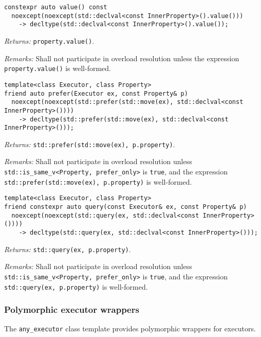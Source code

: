 \documentclass[a4paper,12pt,notitlepage,twoside,openright]{article}
\begin{document}
\begin{verbatim}
constexpr auto value() const
  noexcept(noexcept(std::declval<const InnerProperty>().value()))
    -> decltype(std::declval<const InnerProperty>().value());
\end{verbatim}

\emph{Returns:} \texttt{property.value()}.

\emph{Remarks:} Shall not participate in overload resolution unless the
expression \texttt{property.value()} is well-formed.

\begin{verbatim}
template<class Executor, class Property>
friend auto prefer(Executor ex, const Property& p)
  noexcept(noexcept(std::prefer(std::move(ex), std::declval<const InnerProperty>())))
    -> decltype(std::prefer(std::move(ex), std::declval<const InnerProperty>()));
\end{verbatim}

\emph{Returns:}
\texttt{std::prefer(std::move(ex), p.property)}.

\emph{Remarks:} Shall not participate in overload resolution unless
\texttt{std::is_same_v<Property, prefer_only>} is
\texttt{true}, and the expression
\texttt{std::prefer(std::move(ex), p.property)} is
well-formed.

\begin{verbatim}
template<class Executor, class Property>
friend constexpr auto query(const Executor& ex, const Property& p)
  noexcept(noexcept(std::query(ex, std::declval<const InnerProperty>())))
    -> decltype(std::query(ex, std::declval<const InnerProperty>()));
\end{verbatim}

\emph{Returns:} \texttt{std::query(ex, p.property)}.

\emph{Remarks:} Shall not participate in overload resolution unless
\texttt{std::is_same_v<Property, prefer_only>} is
\texttt{true}, and the expression
\texttt{std::query(ex, p.property)} is well-formed.

\hypertarget{polymorphic-executor-wrappers}{%
\subsubsection{Polymorphic executor
wrappers}\label{polymorphic-executor-wrappers}}

The \texttt{any_executor} class template provides
polymorphic wrappers for executors.
\end{document}
